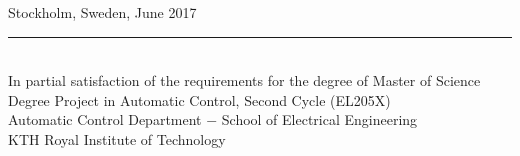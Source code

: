 \begin{titlepage}
\begin{center}
  \large Stockholm, Sweden, June 2017 \\
  \rule{250pt}{2pt} \\
  In partial satisfaction of the requirements for the degree of Master of Science \\
  Degree Project in Automatic Control, Second Cycle (EL205X) \\
  \large Automatic Control Department $-$ School of Electrical Engineering \\
  \large KTH Royal Institute of Technology

\end{center}
\end{titlepage}

